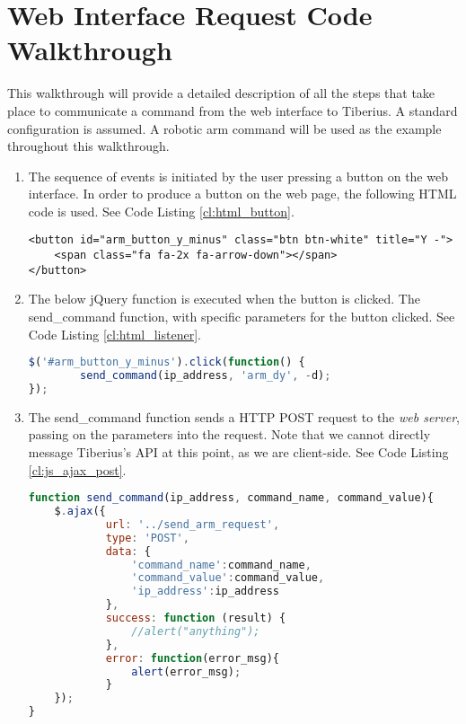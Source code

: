 \chapter{Web Interface Request Code Walkthrough}
\label{app:web_walkthrough}
\pagestyle{cameron}

This walkthrough will provide a detailed description of all the steps that take place to communicate a command from the web interface to Tiberius. A standard configuration is assumed. A robotic arm command will be used as the example throughout this walkthrough.
\newline

\begin{enumerate}

\item The sequence of events is initiated by the user pressing a button on the web interface. In order to produce a button on the web page, the following \gls{HTML} code is used. See Code Listing \ref{cl:html_button}.
\newline

\begin{lstlisting}[caption=HTML Button, label=cl:html_button]
<button id="arm_button_y_minus" class="btn btn-white" title="Y -">
    <span class="fa fa-2x fa-arrow-down"></span>
</button>
\end{lstlisting}

\item The below jQuery function is executed when the button is clicked. The send\_command function, with specific parameters for the button clicked. See Code Listing \ref{cl:html_listener}.
\newline

\begin{lstlisting}[language=JavaScript, caption=jQuery Click Listener, label=cl:button_listener]
$('#arm_button_y_minus').click(function() {
		send_command(ip_address, 'arm_dy', -d);
});
\end{lstlisting}

\item The send\_command function sends a \gls{HTTP} \gls{POST} request to the \textit{web server}, passing on the parameters into the request. Note that we cannot directly message Tiberius's API at this point, as we are client-side. See Code Listing \ref{cl:js_ajax_post}.
\newline

\begin{lstlisting}[language=JavaScript, caption=Javascript message to web server, label=cl:js_ajax_post]
function send_command(ip_address, command_name, command_value){
	$.ajax({
			url: '../send_arm_request',
			type: 'POST',
			data: {
				'command_name':command_name,
				'command_value':command_value,
				'ip_address':ip_address
			},
			success: function (result) {
				//alert("anything");
			},
			error: function(error_msg){
				alert(error_msg);
			}
	});
}
\end{lstlisting}


\end{enumerate}
